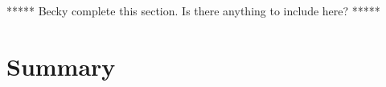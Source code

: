 ***** Becky complete this section. Is there anything to include here? *****

\section{Summary}
\label{sec:intensity_summary}











%
%


